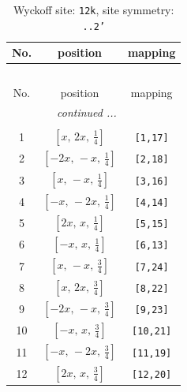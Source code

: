 \documentclass[fleqn,8pt]{jsarticle}
\begin{document}
\begin{longtable}{ccc}
\caption{Wyckoff site: {\tt 12k}, site symmetry: {\tt ..2'}}
 \\
 \hline \hline
No. & position & mapping \\ \hline \endfirsthead

\multicolumn{2}{l}{\tablename\ \thetable{}} \\
 \hline \hline
No. & position & mapping \\ \hline \endhead

 \hline \hline
\multicolumn{2}{r}{\footnotesize\it continued ...} \\ \endfoot

 \hline \hline
\multicolumn{2}{r}{} \\ \endlastfoot

1 & $\left[ x,\, 2 x,\, \frac{1}{4} \right]$ & {\tt [1,17]} \\ \hline
2 & $\left[ - 2 x,\, - x,\, \frac{1}{4} \right]$ & {\tt [2,18]} \\ \hline
3 & $\left[ x,\, - x,\, \frac{1}{4} \right]$ & {\tt [3,16]} \\ \hline
4 & $\left[ - x,\, - 2 x,\, \frac{1}{4} \right]$ & {\tt [4,14]} \\ \hline
5 & $\left[ 2 x,\, x,\, \frac{1}{4} \right]$ & {\tt [5,15]} \\ \hline
6 & $\left[ - x,\, x,\, \frac{1}{4} \right]$ & {\tt [6,13]} \\ \hline
7 & $\left[ x,\, - x,\, \frac{3}{4} \right]$ & {\tt [7,24]} \\ \hline
8 & $\left[ x,\, 2 x,\, \frac{3}{4} \right]$ & {\tt [8,22]} \\ \hline
9 & $\left[ - 2 x,\, - x,\, \frac{3}{4} \right]$ & {\tt [9,23]} \\ \hline
10 & $\left[ - x,\, x,\, \frac{3}{4} \right]$ & {\tt [10,21]} \\ \hline
11 & $\left[ - x,\, - 2 x,\, \frac{3}{4} \right]$ & {\tt [11,19]} \\ \hline
12 & $\left[ 2 x,\, x,\, \frac{3}{4} \right]$ & {\tt [12,20]} \\
\end{longtable}
\renewcommand{\arraystretch}{1.2}
\end{document}

